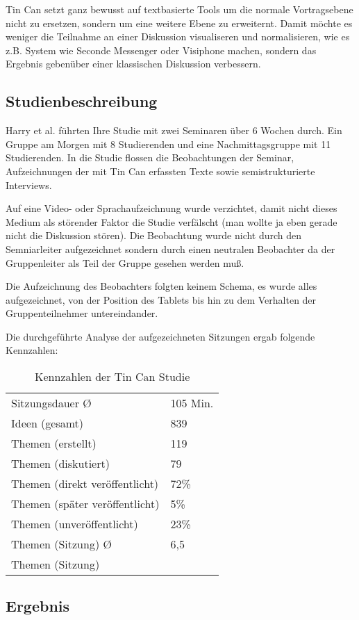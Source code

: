 Tin Can setzt ganz bewusst auf textbasierte Tools um die normale Vortragsebene
nicht zu ersetzen, sondern um eine weitere Ebene zu erweiternt. Damit möchte es
weniger die Teilnahme an einer Diskussion visualiseren und normalisieren, wie es
z.B. System wie Seconde Messenger oder Visiphone machen, sondern das Ergebnis
gebenüber einer klassischen Diskussion verbessern.

\subsection{Studienbeschreibung}
Harry et al. führten Ihre Studie mit zwei Seminaren über 6 Wochen durch. Ein
Gruppe am Morgen mit 8 Studierenden und eine Nachmittagsgruppe mit 11
Studierenden. In die Studie flossen die Beobachtungen der Seminar,
Aufzeichnungen der mit Tin Can erfassten Texte sowie semistrukturierte
Interviews.

Auf eine Video- oder Sprachaufzeichnung wurde verzichtet, damit nicht dieses
Medium als störender Faktor die Studie verfälscht (man wollte ja eben gerade
nicht die Diskussion stören). Die Beobachtung wurde nicht durch den
Semniarleiter aufgezeichnet sondern durch einen neutralen Beobachter da der
Gruppenleiter als Teil der Gruppe gesehen werden muß.

Die Aufzeichnung des Beobachters folgten keinem Schema, es wurde alles
aufgezeichnet, von der Position des Tablets bis hin zu dem Verhalten der
Gruppenteilnehmer untereindander.

Die durchgeführte Analyse der aufgezeichneten Sitzungen ergab folgende Kennzahlen:

\begin{table}[htp]
  \begin{tabular}{ l  l }
    Sitzungsdauer \O & 105 Min.\\
    Ideen  (gesamt) &  839 \\
    
    Themen (erstellt) & 119 \\
    Themen (diskutiert) & 79 \\
    Themen (direkt veröffentlicht) & 72\% \\
    Themen (später veröffentlicht) & 5\% \\ 
    Themen (unveröffentlicht) & 23\% \\
    Themen (Sitzung) \O & 6,5 \\
    Themen (Sitzung) 
  \end{tabular}
  \caption{Kennzahlen der Tin Can Studie}
\end{table}


\subsection{Ergebnis}

